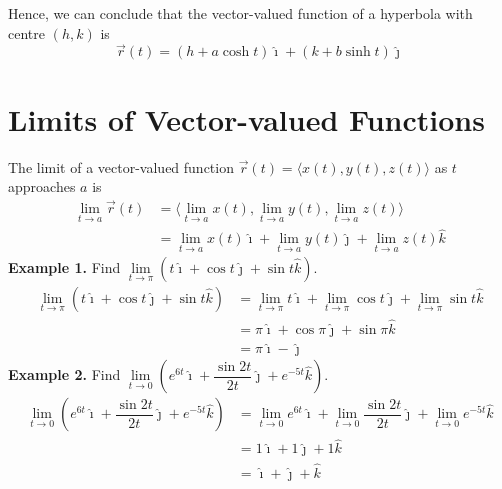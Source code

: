 \documentclass{report}
\begin{document}
Hence, we can conclude that the vector-valued function of a hyperbola with centre $(h, k)$ is \[\vec{r}(t) = (h + a\cosh{t})\hat{\imath} + (k + b\sinh{t})\hat{\jmath}\]

\chapter{Limits of Vector-valued Functions}

The limit of a vector-valued function $\vec{r}(t) = \langle x(t), y(t), z(t)
    \rangle$ as $t$ approaches $a$ is
\begin{align*}
    \lim_{t \to a} \vec{r}(t) & = \langle\lim_{t \to a} x(t), \lim_{t \to a} y(t), \lim_{t \to a} z(t) \rangle                   \\
                              & = \lim_{t \to a} x(t)\hat{\imath} + \lim_{t \to a} y(t)\hat{\jmath} + \lim_{t \to a} z(t)\hat{k}
\end{align*}
\noindent\textbf{Example 1. } Find $\lim\limits_{t \to \pi}(t\hat{\imath} + \cos t\hat{\jmath} + \sin t\hat{k})$.
\begin{align*}
    \lim_{t \to \pi} (t\hat{\imath} + \cos t\hat{\jmath} + \sin t\hat{k}) & = \lim_{t \to \pi} t\hat{\imath} + \lim_{t \to \pi} \cos t\hat{\jmath} + \lim_{t \to \pi} \sin t\hat{k} \\
                                                                          & = \pi\hat{\imath} + \cos \pi\hat{\jmath} + \sin \pi\hat{k}                                              \\
                                                                          & = \pi\hat{\imath} - \hat{\jmath}
\end{align*}
\noindent\textbf{Example 2. } Find $\lim\limits_{t \to 0}(e^{6t}\hat{\imath} + \dfrac{\sin{2t}}{2t}\hat{\jmath} + e^{-5t}\hat{k})$.
\begin{align*}
    \lim_{t \to 0} (e^{6t}\hat{\imath} + \dfrac{\sin{2t}}{2t}\hat{\jmath} + e^{-5t}\hat{k}) & = \lim_{t \to 0} e^{6t}\hat{\imath} + \lim_{t \to 0} \dfrac{\sin{2t}}{2t}\hat{\jmath} + \lim_{t \to 0} e^{-5t}\hat{k} \\
                                                                                            & = 1\hat{\imath} + 1\hat{\jmath} + 1\hat{k}                                                                            \\
                                                                                            & = \hat{\imath} + \hat{\jmath} + \hat{k}
\end{align*}
\end{document}
